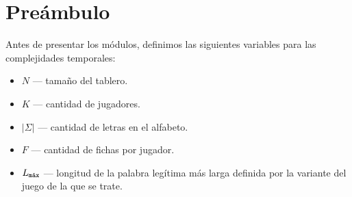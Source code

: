 \section{Preámbulo}
Antes de presentar los módulos, definimos las siguientes variables para las complejidades temporales:
\begin{itemize}
    \item $N$ \---- tamaño del tablero.
    \item $K$ \---- cantidad de jugadores.
    \item $|\Sigma|$ \---- cantidad de letras en el alfabeto.
    \item $F$ \---- cantidad de fichas por jugador.
    \item $\Lmax$ \---- longitud de la palabra legítima más larga definida por la variante del juego de la que se trate.
\end{itemize}

